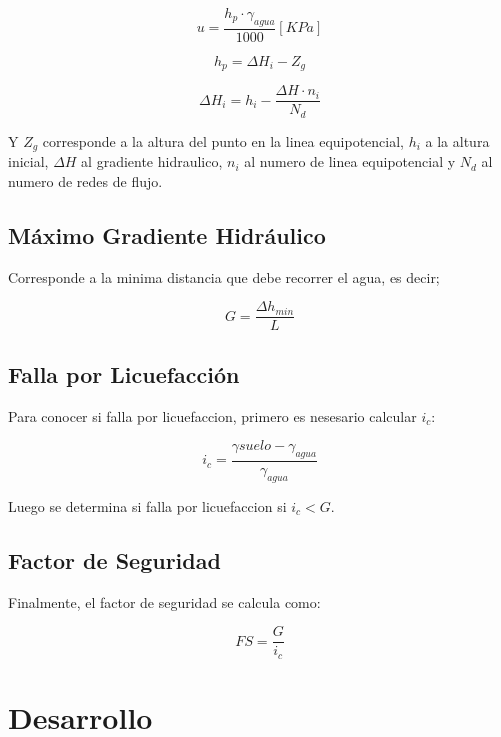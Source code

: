 \begin{equation}
  u = \frac{h_p \cdot \gamma_{agua}}{1000} [KPa]
\end{equation}

\begin{equation}
  h_p = \Delta H_i - Z_g
\end{equation}

\begin{equation}
  \Delta H_i = h_i - \frac{\Delta H \cdot n_i}{N_d}
\end{equation}

Y $Z_g$ corresponde a la altura del punto en la linea equipotencial, $h_i$ a la altura inicial, $\Delta H$ al gradiente hidraulico, $n_i$ al numero de linea equipotencial y $N_d$ al numero de redes de flujo.

\subsection{Máximo Gradiente Hidráulico}

Corresponde a la minima distancia que debe recorrer el agua, es decir;

\begin{equation}
  G = \frac{\Delta h_{min}}{L}
\end{equation}

\subsection{Falla por Licuefacción}

Para conocer si falla por licuefaccion, primero es nesesario calcular $i_c$:

\begin{equation}
  i_c = \frac{\gamma{suelo} - \gamma_{agua}}{\gamma_{agua}}
\end{equation}

Luego se determina si falla por licuefaccion si $i_c < G$.

\subsection{Factor de Seguridad}

Finalmente, el factor de seguridad se calcula como:

\begin{equation}
  FS = \frac{G}{i_c}
\end{equation}

\section{Desarrollo}


